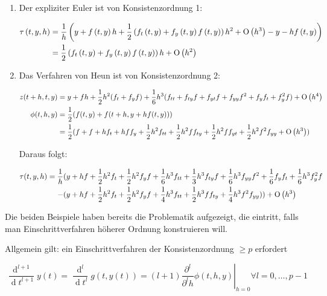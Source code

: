 \begin{example}
	\*
	\begin{enumerate}
		\item
			Der expliziter Euler ist von Konsistenzordnung 1:
			
			\begin{align*}
				\tau\left(t,y,h\right) &= \frac{1}{h} \left(y + f\left(t,y\right) h + \frac{1}{2} \left(f_t\left(t,y\right) + f_y\left(t,y\right) f\left(t,y\right)\right) h^2 + \operatorname{O}\left(h^3\right) - y - hf\left(t,y\right)\right) \\
				& = \frac{1}{2} \left(f_t\left(t,y\right) + f_y\left(t,y\right) f\left(t,y\right)\right) h + \operatorname{O}\left(h^2\right) 
			\end{align*}
			
		\item
			Das Verfahren von Heun ist von Konsistenzordnung 2:
			
			\begin{align*}
				z(t+h,t,y) &= y+f h + \frac{1}{2} h^2 (f_t + f_yf) + \frac{1}{6} h^3(f_{tt} + f_{ty}f + f_{yt} f + f_{yy}f^2 + f_yf_t + f_y^2 f) + \operatorname{O}\left(h^4\right) \\
				\phi(t,h,y) &= \frac{1}{2} ( f(t,y) + f(t+h, y+hf(t,y))) \\
				&= \frac{1}{2} (f + f + hf_t + h f f_y + \frac{1}{2} h^2 f_{tt} + \frac{1}{2}  h^{2} f f_{ty}+ \frac{1}{2}  h^{2} f f_{yt} + \frac{1}{2} h^2 f^2 f_{yy} + \operatorname{O}\left(h^3\right))
			\end{align*}
			
			Daraus folgt:
			
			\begin{align*}
				\tau(t,y,h) = \frac{1}{h} &(y + hf + \frac{1}{2} h^2 f_t + \frac{1}{2} h^2 f_yf + \frac{1}{6} h^3 f_{tt} + \frac{1}{3} h^{3} f_{ty}f + \frac{1}{6} h^3 f_{yy} f^2 + \frac{1}{6} f_yf_t + \frac{1}{6} h^3 f_y^2 f \\
				- &(y + hf + \frac{1}{2} h^2 f_t + \frac{1}{2} h^2 f_yf +\frac{1}{4}h^3 f_{tt}+ \frac{1}{2} h^3 ff_{ty} + \frac{1}{4} h^3 f^2f_{yy})) + \operatorname{O}\left(h^3\right)
			\end{align*}
	\end{enumerate}
\end{example}

Die beiden Beispiele haben bereits die Problematik aufgezeigt, die eintritt, falls man Einschrittverfahren höherer Ordnung konstruieren will. 

Allgemein gilt: ein Einschrittverfahren der Konsistenzordnung $\ge p$ erfordert 

$$\frac{\operatorname{d}^{l+1}}{\operatorname{d}t^{l+1}} y(t) = \frac{\operatorname{d}^{l}}{\operatorname{d}t^{l}} g(t,y(t)) = \left. (l+1) \frac{\partial^l}{\partial^l h} \phi (t,h,y) \right|_{h = 0} \forall l=0, \dots, p-1$$ 

